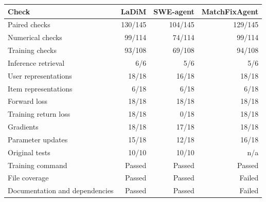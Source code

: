 \begin{tabular*}{\linewidth}{@{\extracolsep{\fill}}lrrr@{}}
\toprule
\textbf{Check} & \textbf{LaDiM} & \textbf{SWE-agent} & \textbf{MatchFixAgent} \\
\midrule
Paired checks & 130/145 & 104/145 & 129/145 \\
Numerical checks & 99/114 & 74/114 & 99/114 \\
Training checks & 93/108 & 69/108 & 94/108 \\
Inference retrieval & 6/6 & 5/6 & 5/6 \\
\midrule
User representations & 18/18 & 16/18 & 18/18 \\
Item representations & 6/18 & 6/18 & 6/18 \\
Forward loss & 18/18 & 18/18 & 18/18 \\
Training return loss & 18/18 & 0/18 & 18/18 \\
Gradients & 18/18 & 17/18 & 18/18 \\
Parameter updates & 15/18 & 12/18 & 16/18 \\
\midrule
Original tests & 10/10 & 10/10 & n/a \\
Training command & Passed & Passed & Passed \\
File coverage & Passed & Passed & Failed \\
Documentation and dependencies & Passed & Passed & Failed \\
\bottomrule
\end{tabular*}
